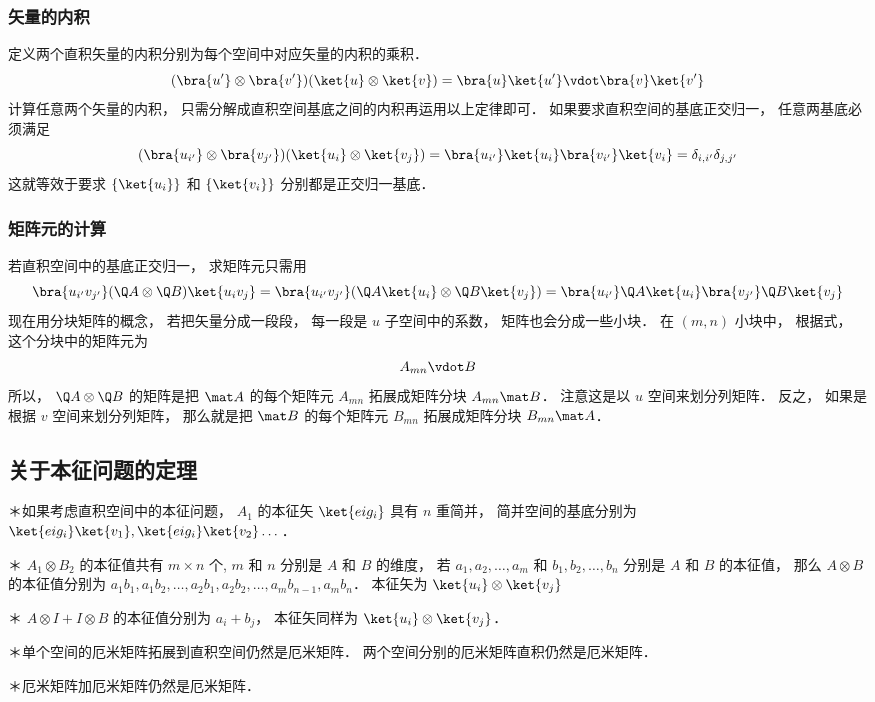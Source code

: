 \subsubsection{矢量的内积}

定义两个直积矢量的内积分别为每个空间中对应矢量的内积的乘积．
\begin{equation}
(\bra{u'}\otimes\bra{v'})(\ket{u}\otimes\ket{v}) = \bra{u}\ket{u'}\vdot\bra{v}\ket{v'}
\end{equation}
计算任意两个矢量的内积， 只需分解成直积空间基底之间的内积再运用以上定律即可． 如果要求直积空间的基底正交归一， 任意两基底必须满足
\begin{equation}
(\bra{u_{i'}} \otimes \bra{v_{j'}})(\ket{u_i} \otimes \ket{v_j}) = \bra{u_{i'}}\ket{u_i} \bra{v_{i'}}\ket{v_i} = \delta_{i,i'}\delta_{j,j'}
\end{equation}
这就等效于要求 $\{\ket{u_i}\}$ 和 $\{\ket{v_i}\}$  分别都是正交归一基底．

\subsubsection{矩阵元的计算}
若直积空间中的基底正交归一， 求矩阵元只需用
\begin{equation}
\bra{u_{i'} v_{j'}} (\Q A \otimes \Q B) \ket{u_i v_j} = \bra{u_{i'} v_{j'}} (\Q A \ket{u_i} \otimes \Q B \ket{v_j}) = \bra{u_{i'}} \Q A \ket{u_i} \bra{v_{j'}} \Q B \ket{v_j}
\end{equation}
现在用分块矩阵的概念， 若把矢量分成一段段， 每一段是 $u$ 子空间中的系数， 矩阵也会分成一些小块． 在 $(m, n)$ 小块中， 根据式， 这个分块中的矩阵元为
\begin{equation}
A_{mn} \vdot B
\end{equation}
所以， $\Q A \otimes \Q B$ 的矩阵是把 $\mat A$ 的每个矩阵元 $A_{mn}$ 拓展成矩阵分块 $A_{mn} \mat B$．  注意这是以 $u$ 空间来划分列矩阵． 反之， 如果是根据 $v$ 空间来划分列矩阵， 那么就是把 $\mat B$ 的每个矩阵元 $B_{mn}$ 拓展成矩阵分块 $B_{mn} \mat A$． 

\subsection{关于本征问题的定理}%
	
＊如果考虑直积空间中的本征问题， $A_1$  的本征矢 $\ket{eig_i}$ 具有 $n$ 重简并， 简并空间的基底分别为 $\ket{eig_i}\ket{v_1}, \ket{eig_i}\ket{v_2}\dots$． 

＊ $A_1 \otimes B_2$ 的本征值共有 $m \times n$ 个, $m$ 和 $n$ 分别是 $A$ 和 $B$ 的维度， 若 $a_1, a_2,\dots, a_m$ 和 $b_1, b_2, \dots, b_n$ 分别是 $A$ 和 $B$ 的本征值， 那么 $A \otimes B$ 的本征值分别为 $a_1 b_1, a_1 b_2, \dots, a_2 b_1, a_2 b_2, \dots, a_m b_{n-1}, a_m b_n$．  本征矢为 $\ket{u_i} \otimes \ket{v_j}$ 

＊ $A \otimes I + I \otimes B$ 的本征值分别为 $a_i + b_j$，  本征矢同样为 $\ket{u_i} \otimes \ket{v_j}$． 

＊单个空间的厄米矩阵拓展到直积空间仍然是厄米矩阵． 两个空间分别的厄米矩阵直积仍然是厄米矩阵． 

＊厄米矩阵加厄米矩阵仍然是厄米矩阵．

